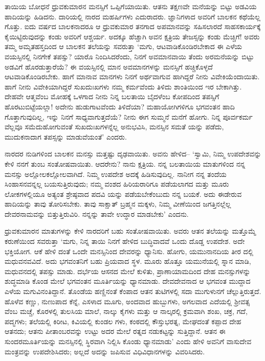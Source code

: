 ತಾಯಿಯ ಬೋಧನೆ ಧ್ರುವಕುಮಾರನ ಮನಸ್ಸಿಗೆ ಒಪ್ಪಿಗೆಯಾಯಿತು. ಆತನು ತಕ್ಷಣವೇ ಮನೆಯನ್ನು ಬಿಟ್ಟು ಅಡವಿಯ ಹಾದಿಯನ್ನು ಹಿಡಿದನು. ದಾರಿಯಲ್ಲಿ ನಾರದ ಮಹರ್ಷಿಗಳು ಎದುರಾದರು. ಜ್ಞಾನಿಗಳಾದ ಅವರಿಗೆ ಬಾಲಕನ ಕಥೆಯೆಲ್ಲ ಗೊತ್ತು. ಐದು ವರ್ಷದ ಬಾಲಕನಾದರೂ ಆ ಧ್ರುವಕುಮಾರ ತನಗಾದ ಅಪಮಾನವನ್ನು ಸಹಿಸಲಾರದೆ ಸಾಹಸಕಾರ್ಯಕ್ಕೆ ಕೈಯಿಟ್ಟಿರುವುದನ್ನು ಕಂಡು ಅವರಿಗೆ ಆಶ್ಚರ್ಯ. ಅದಕ್ಕೂ ಹೆಚ್ಚಾಗಿ ಅವನ ಕ್ಷತ್ರಿಯ ತೇಜಸ್ಸನ್ನು ಕಂಡು ಮೆಚ್ಚಿಗೆ! ಅವರು ತಮ್ಮ ಅಮೃತಹಸ್ತದಿಂದ ಆ ಬಾಲಕನ ತಲೆಯನ್ನು ಸವರುತ್ತಾ ‘ಮಗು, ಆಟವಾಡಿಕೊಂಡಿರಬೇಕಾದ ಈ ಎಳೆಯ ವಯಸ್ಸಿನಲ್ಲಿ ನಿನಗೇಕೆ ತಪಸ್ಸು? ಯಾರೊ ನಿಂದಿಸಿದರೆಂದು, ನಿನಗೆ ಅವಮಾನವಾಯಿ ತೆಂದು ಅರಮನೆಯನ್ನು ಬಿಟ್ಟು ಅಡವಿಗೆ ಹೊರಡುತ್ತಾರೆಯೆ? ಈ ವಯಸ್ಸಿನಲ್ಲಿ ಮಾನ ಅವಮಾನಗಳನ್ನು ಮನಸ್ಸಿಗೆ ಹಚ್ಚಿಕೊಳ್ಳದೆ ಆಟವಾಡಿಕೊಂಡಿರಬೇಕು. ಹಾಗೆ ಮಾನಾವ ಮಾನಗಳು ನಿನಗೆ ಅರ್ಥವಾಗುವ ಹಾಗಿದ್ದರೆ ನೀನು ವಿವೇಕಿಯೆಂದಾಯಿತು. ಹಾಗೆ ನೀನು ವಿವೇಕಿಯಾಗಿದ್ದರೆ ಸುಖದುಃಖಗಳು ನಮ್ಮ ಕರ್ಮವೆಂದು ತಿಳಿದು ಶಾಂತಿಯಿಂದ ಇರ ಬೇಕಾಗಿತ್ತು. ದೇಹವೇ ಆತ್ಮವೆಂಬ ಮೋಹಕ್ಕೆ ಒಳಗಾದ ನೀನು ನಿನ್ನ ಬಲತಾಯಿ ಬೈದಳೆಂಬ ಕೋಪದಿಂದ ತಪಸ್ಸಿಗೆ ಹೊರಟುಬಿಟ್ಟೆಯಲ್ಲಾ! ಅದೇನು ಹುಡುಗಾಟವೆಂದು ತಿಳಿದೆಯಾ? ಮಹಾಯೋಗಿಗಳಿಗೂ ಭಗವಂತನ ಹಾದಿ ಗೊತ್ತಾಗುವುದಿಲ್ಲ, ಇನ್ನು ನಿನಗೆ ಸಾಧ್ಯವಾಗುತ್ತದೆಯೆ? ನೀನು ಈಗ ಸುಮ್ಮನೆ ಮನೆಗೆ ಹೋಗು. ನಿನ್ನ ಪೂರ್ವಕರ್ಮ ವೆಲ್ಲವೂ ಸಮೆದುಹೋಗುವಂತೆ ಸುಖದುಃಖಗಳನ್ನೆಲ್ಲ ಅನುಭವಿಸಿ, ಮನಸ್ಸಿನ ಸಮತೆ ಯನ್ನು ಪಡೆದು, ಮುದುಕನಾದಾಗ ತಪಸ್ಸನ್ನು ಮಾಡುವೆಯಂತೆ’ ಎಂದರು.

ನಾರದರ ನುಡಿಗಳಿಂದ ಬಾಲಕನ ಮನಸ್ಸು ಮತ್ತಷ್ಟು ದೃಢವಾಯಿತು. ಅವನು ಹೇಳಿದ– ‘ಸ್ವಾಮಿ, ನಿಮ್ಮ ಉಪದೇಶವನ್ನು ಕೇಳಿ ನನಗೆ ತುಂಬ ಸಂತೋಷವಾಯಿತು. ಆದರೇನು? ನಾನು ಕ್ಷತ್ರಿಯ. ನನ್ನ ಬಲತಾಯಿಯ ಮಾತುಗಳಿಂದ ನನ್ನ ಮನಸ್ಸು ಅಲ್ಲೋಲಕಲ್ಲೋಲವಾಗಿದೆ. ನಿಮ್ಮ ಉಪದೇಶ ಅದಕ್ಕೆ ಹಿಡಿಸುವುದಿಲ್ಲ. ನಾನೀಗ ನನ್ನ ತಂದೆಯ ಸಿಂಹಾಸನವನ್ನಲ್ಲ ಬಯಸುತ್ತಿರುವುದು; ನಮ್ಮ ವಂಶದ ಹಿರಿಯರಾರಿಗೂ ಪಡೆಯಲಾಗದ ಮತ್ತು ಮೂರು ಲೋಕಗಳಲ್ಲಿಯೂ ಅತ್ಯಂತ ಶ್ರೇಷ್ಠವಾದ ಪದವಿ ಯನ್ನು ಪಡೆಯಬೇಕೆಂಬುದು ನನ್ನ ಬಯಕೆ. ಅದು ಈಡೇರುವ ಹಾದಿಯನ್ನು ತಾವು ತೋರಿಸಬೇಕು. ತಾವು ಸಾಕ್ಷಾತ್ ಬ್ರಹ್ಮನ ಮಕ್ಕಳು, ನಿಮ್ಮ ವೀಣೆಯಿಂದ ಜಗತ್ತಿನಲ್ಲೆಲ್ಲ ದೇವರನಾಮವನ್ನು ಬಿತ್ತುತ್ತಿರುವಿರಿ. ನನ್ನನ್ನು ತಾವೇ ಉದ್ಧಾರ ಮಾಡಬೇಕು’ ಎಂದನು.

ಧ್ರುವಕುಮಾರನ ಮಾತುಗಳನ್ನು ಕೇಳಿ ನಾರದರಿಗೆ ಬಹು ಸಂತೋಷವಾಯಿತು. ಅವರು ಆತನ ತಲೆಯನ್ನು ಮತ್ತೊಮ್ಮೆ ಕರುಣೆಯಿಂದ ಸವರುತ್ತಾ ‘ಮಗು, ನಿನ್ನ ತಾಯಿ ನಿನಗೆ ಹೇಳಿದ ಬುದ್ಧಿವಾದವೆ ಒಂದು ದೊಡ್ಡ ಉಪದೇಶ. ಅದೇ ಭಕ್ತಿಯೋಗ. ಆಕೆ ಹೇಳಿ ದಂತೆ ಒಂದೇ ಮನಸ್ಸಿನಿಂದ ದೇವರನ್ನು ಧ್ಯಾನಿಸು. ಹೋಗು, ಯಮುನಾನದಿಯ ತೀರ ದಲ್ಲಿ ಮಧುವನವವಿದೆ. ಅದು ಭಗವಂತನಿಗೆ ಬಹು ಪ್ರಿಯವಾದ ಸ್ಥಳ. ಮೂರು ಹೊತ್ತೂ ಯಮುನೆಯಲ್ಲಿ ಸ್ನಾನ ಮಾಡಿ, ಮಧುವನದಲ್ಲಿ ತಪಸ್ಸು ಮಾಡು. ದರ್ಭೆಯ ಆಸನದ ಮೇಲೆ ಕುಳಿತು, ಪ್ರಾಣಾಯಾಮದಿಂದ ದೇಹ ಮನಸ್ಸುಗಳನ್ನು ಶುದ್ಧಮಾಡಿ ಕೊಂಡ ಮೇಲೆ ಭಗವಂತನ ಮೂರ್ತಿಯನ್ನು ಧ್ಯಾನಮಾಡು. ದೇವದೇವನಾದ ಆ ಭಗವಂತ ಮುದ್ದಾದ ಎಳೆಯ ಮಗುವಿನಂತಿದ್ದಾನೆ. ತೊಂಡೆಯ ಹಣ್ಣಿನಂತೆ ಕೆಂಪಾದ ಆತನ ತುಟಿಗಳಲ್ಲಿ ಸದಾ ಮುಗುಳುನಗೆ ಚೆಲ್ಲುತ್ತಿರುತ್ತದೆ. ಹೊಳೆವ ಕಣ್ಣು, ನುಣುಪಾದ ಕೆನ್ನೆ, ಎಸಳಾದ ಮೂಗು, ಅಂದವಾದ ಹುಬ್ಬುಗಳು, ಅಗಲವಾದ ಎದೆಯಲ್ಲಿ ಶ್ರೀವತ್ಸ ವೆಂಬ ಮಚ್ಚೆ, ಕೊರಳಲ್ಲಿ ತುಲಸಿಯ ಮಾಲೆ, ನಾಲ್ಕು ಕೈಗಳು ಮತ್ತು ಆ ನಾಲ್ಕರಲ್ಲಿ ಕ್ರಮವಾಗಿ ಶಂಖ, ಚಕ್ರ, ಗದೆ, ಪದ್ಮಗಳು; ತಲೆಯಲ್ಲಿ ಕಿರೀಟ, ಕಿವಿಯಲ್ಲಿ ಕುಂಡಲ ಗಳು, ಕಂಠದಲ್ಲಿ ಕೌಸ್ತುಭರತ್ನ, ಮೇಘದಂತೆ ಕಪ್ಪಾದ ದೇಹ ಆತನದು; ಆತನು ಪೀತಾಂಬರವನ್ನು ಉಟ್ಟು ಅದರ ಮೇಲೆ ರತ್ನದ ನಡುಕಟ್ಟನ್ನು ಸುತ್ತಿದ್ದಾನೆ. ಆತನ ಈ ಸುಂದರಮೂರ್ತಿಯನ್ನು ಮನಸ್ಸಿನಲ್ಲಿ ಸ್ಥಿರವಾಗಿ ನಿಲ್ಲಿಸಿ ಕೊಂಡು ಧ್ಯಾನಮಾಡು’ ಎಂದು ಹೇಳಿ ಅವನಿಗೆ ವಾಸುದೇವ ಮಂತ್ರವನ್ನು ಉಪದೇಶಿಸಿದರು; ಅಲ್ಲದೆ ಅದನ್ನು ಜಪಿಸುವ ವಿಧಿವಿಧಾನಗಳನ್ನು ವಿವರಿಸಿದರು.


